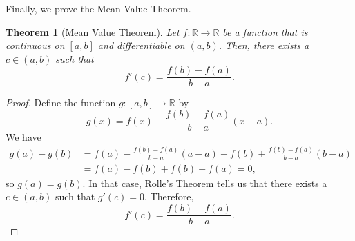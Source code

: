 \documentclass[a4paper, openany]{memoir}
\theoremstyle{definition}
\theoremstyle{plain}
\newtheorem{theorem}[definition]{Theorem}
\begin{document}
\noindent Finally, we prove the Mean Value Theorem.
\begin{theorem}[Mean Value Theorem]
Let $f: \mathbb{R} \to \mathbb{R}$ be a function that is continuous on $[a, b]$ and differentiable on $(a, b)$. Then, there exists a $c \in (a, b)$ such that
\[f'(c) = \frac{f(b) - f(a)}{b - a}.\]
\end{theorem}
\begin{proof}
Define the function $g: [a, b] \to \mathbb{R}$ by
\[g(x) = f(x) - \frac{f(b) - f(a)}{b - a}(x - a).\]
We have
\begin{align*}
    g(a) - g(b) &= f(a) - \frac{f(b) - f(a)}{b - a} (a - a) - f(b) + \frac{f(b) - f(a)}{b - a}(b - a) \\
    &= f(a) - f(b) + f(b) - f(a) = 0,
\end{align*}
so $g(a) = g(b)$. In that case, Rolle's Theorem tells us that there exists a $c \in (a, b)$ such that $g'(c) = 0$. Therefore,
\[f'(c) = \frac{f(b) - f(a)}{b - a}.\]
\end{proof}
\end{document}
